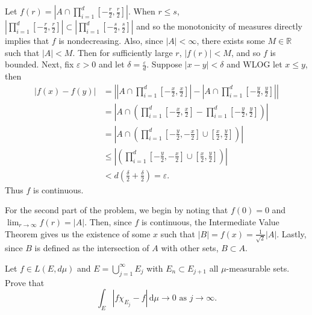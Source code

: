 \begin{solution}
  Let $f(r) = \left| A \cap \prod_{i=1}^{d } [-\frac{r}{2}, \frac{r}{2}] \right|$.
  When $r\leq s$, $\left| \prod_{i=1}^{d } [-\frac{r}{2}, \frac{r}{2}] \right| \subset \left| \prod_{i=1}^{d } [-\frac{s}{2}, \frac{s}{2}] \right|$ and so the monotonicity of measures directly implies that $f$ is nondecreasing.
  Also, since $\left| A \right| < \infty$, there exists some $M \in \mathbb{R}^{}$ such that $\left| A \right| < M$.
  Then for sufficiently large $r$, $\left| f(r) \right| < M$, and so $f$ is bounded.
  Next, fix $\varepsilon > 0$ and let $\delta = \frac{\varepsilon}{d}$.
  Suppose $\left| x - y \right| < \delta$ and WLOG let $x \leq  y$, then
    \begin{align*}
      \left| f(x) - f(y) \right| &= \left| \left| A \cap \prod_{i=1}^{d } [-\frac{x}{2}, \frac{x}{2}] \right| - \left| A \cap \prod_{i=1}^{d } [-\frac{y}{2}, \frac{y}{2}] \right| \right| \\
                                 &= \left| A \cap \left( \prod_{i=1}^{d } [-\frac{x}{2}, \frac{x}{2}] - \prod_{i=1}^{d } [-\frac{y}{2}, \frac{y}{2}] \right) \right| \tag{Class Corollary}\\
                                 &= \left| A \cap \left( \prod_{i=1}^{d } [-\frac{y}{2}, -\frac{x}{2}] \cup  [\frac{x}{2}, \frac{y}{2}] \right) \right| \\
                                 &\leq \left| \left( \prod_{i=1}^{d } [-\frac{y}{2}, -\frac{x}{2}] \cup  [\frac{x}{2}, \frac{y}{2}] \right) \right| \tag{Monotonicity} \\
                                 &< d \left( \frac{\delta}{2} + \frac{\delta}{2} \right) = \varepsilon 
    .\end{align*}
  Thus $f$ is continuous.

  For the second part of the problem, we begin by noting that $f(0) = 0$ and \\$\lim_{r \to \infty}f(r) = \left| A \right| $.
  Then, since $f$ is continuous, the Intermediate Value Theorem gives us the existence of some $x$ such that $\left| B \right| = f(x) = \frac{1}{\sqrt{2} }\left| A \right|$.
  Lastly, since $B$ is defined as the intersection of $A$ with other sets, $B \subset A$.
\end{solution}

\pagebreak

\begin{problem}{4}
  Let $f \in L\left( E, d \mu \right)$ and $E = \bigcup_{j=1}^{\infty} E_{j} $ with $E_{n} \subset E_{j+1}$ all $\mu$-measurable sets.
  Prove that
  \[
  \int_{E} \! \left| f \chi_{E_{j}} - f \right| \, \mathrm{d} \mu \to 0 \text{ as } j \to \infty
  .\] 
\end{problem}

